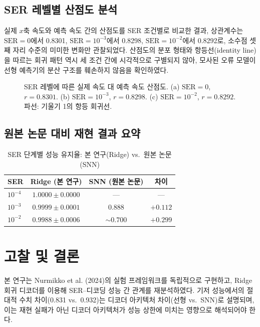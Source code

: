 \documentclass[12pt, a4paper]{article}
\begin{document}
\subsection{SER 레벨별 산점도 분석}

실제 $x$축 속도와 예측 속도 간의 산점도를 SER 조건별로 비교한 결과,
상관계수는 $\text{SER} = 0$에서 0.8301, $\text{SER} = 10^{-3}$에서 0.8298,
$\text{SER} = 10^{-2}$에서 0.8292로, 소수점 셋째 자리 수준의 미미한 변화만 관찰되었다.
산점도의 분포 형태와 항등선(identity line)을 따르는 회귀 패턴 역시 세 조건 간에
시각적으로 구별되지 않아, 모사된 오류 모델이 선형 예측기의 분산 구조를 훼손하지 않음을
확인하였다.

\begin{figure}[htbp]
  \centering
  \caption{SER 레벨에 따른 실제 속도 대 예측 속도 산점도.
    (a) $\text{SER} = 0$, $r = 0.8301$.
    (b) $\text{SER} = 10^{-3}$, $r = 0.8298$.
    (c) $\text{SER} = 10^{-2}$, $r = 0.8292$.
    파선: 기울기 1의 항등 회귀선.}
  \label{fig:scatter}
\end{figure}

\subsection{원본 논문 대비 재현 결과 요약}

\begin{table}[htbp]
  \centering
  \caption{SER 단계별 성능 유지율: 본 연구(Ridge) vs.\ 원본 논문(SNN)}
  \label{tab:results}
  \begin{tabular}{lccc}
    \toprule
    SER & Ridge (본 연구) & SNN (원본 논문) & 차이 \\
    \midrule
    $10^{-4}$ & $1.0000 \pm 0.0000$ & --- & --- \\
    $10^{-3}$ & $0.9999 \pm 0.0001$ & $0.888$ & $+0.112$ \\
    $10^{-2}$ & $0.9988 \pm 0.0006$ & ${\sim}0.700$ & $+0.299$ \\
    \bottomrule
  \end{tabular}
\end{table}

\section{고찰 및 결론}

본 연구는 Nurmikko et al. (2024)의 실험 프레임워크를 독립적으로 구현하고,
Ridge 회귀 디코더를 이용해 SER--디코딩 성능 간 관계를 재분석하였다.
기저 성능에서의 절대적 수치 차이(0.831 vs.\ 0.932)는 디코더 아키텍처 차이(선형 vs.\ SNN)로 설명되며,
이는 재현 실패가 아닌 디코더 아키텍처가 성능 상한에 미치는 영향으로 해석되어야 한다.
\end{document}
